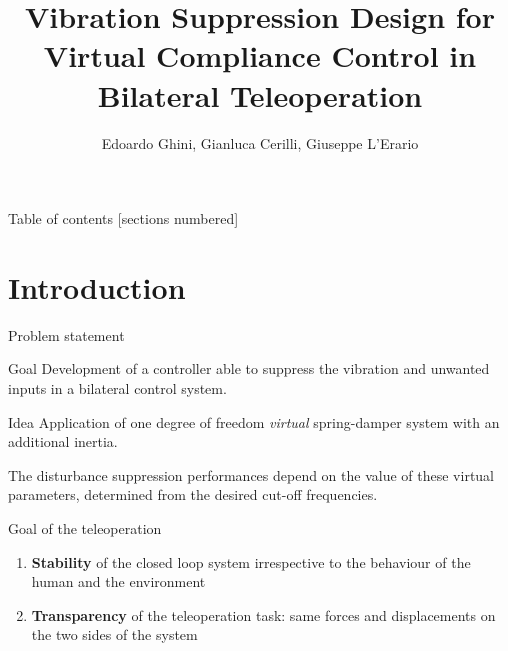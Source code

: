 \documentclass[10pt]{beamer}
\title{Vibration Suppression Design for Virtual Compliance Control in Bilateral Teleoperation}
\date{}
\author{Edoardo Ghini, Gianluca Cerilli, Giuseppe L'Erario}
\institute{Locomotion and haptic interfaces for VR exploration}
\begin{document}
	
	\maketitle
	
	\begin{frame}{Table of contents}
	[sections numbered]
	\tableofcontents[hideallsubsections]
\end{frame}

\section{Introduction}

\begin{frame}[fragile]{Problem statement}

\begin{alertblock}{Goal \bigskip}
	Development of a controller able to suppress the vibration and unwanted inputs in a bilateral control system.
\end{alertblock}

\begin{alertblock}{Idea \bigskip}
	Application of one degree of freedom \textit{virtual }spring-damper system with an additional inertia.
	
	The disturbance suppression performances depend on the value of these virtual parameters, determined from the desired cut-off frequencies.
\end{alertblock}



\end{frame}
\begin{frame}[fragile]{Goal of the teleoperation}

\begin{enumerate}
\item \textbf{Stability} of the closed loop system irrespective to the behaviour of the human and the environment
\bigskip
\item \textbf{Transparency} of the teleoperation task: same forces and displacements on the two sides of the system \end{enumerate}

\end{frame}
\end{document}
